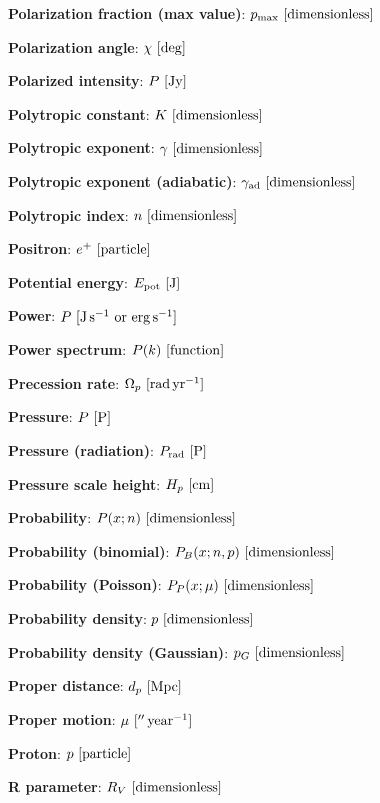 \documentclass[a4paper,10pt]{article}
\begin{document}
{\noindent}\textbf{Polarization fraction (max value)}: $p_\mathrm{max} ~ [{\rm dimensionless}]$

{\noindent}\textbf{Polarization angle}: $\chi ~ [{\rm deg}]$

{\noindent}\textbf{Polarized intensity}: $P ~ [{\rm Jy}]$

{\noindent}\textbf{Polytropic constant}: $K ~ [{\rm dimensionless}]$

{\noindent}\textbf{Polytropic exponent}: $\gamma ~ [{\rm dimensionless}]$

{\noindent}\textbf{Polytropic exponent (adiabatic)}: $\gamma_{\rm ad} ~ [{\rm dimensionless}]$

{\noindent}\textbf{Polytropic index}: $n ~ [{\rm dimensionless}]$

{\noindent}\textbf{Positron}: $e^+ ~ [{\rm particle}]$

{\noindent}\textbf{Potential energy}: $E_\mathrm{pot} ~ [{\rm J}]$

{\noindent}\textbf{Power}: $P ~ [{\rm J\,s^{-1}~{\rm or}~{\rm erg\,s^{-1}}}]$

{\noindent}\textbf{Power spectrum}: $P(k) ~ [{\rm function}]$

{\noindent}\textbf{Precession rate}: $\Omega_p ~ [{\rm rad\,yr^{-1}}]$

{\noindent}\textbf{Pressure}: $P ~ [{\rm P}]$

{\noindent}\textbf{Pressure (radiation)}: $P_{\rm rad} ~ [{\rm P}]$

{\noindent}\textbf{Pressure scale height}: $H_p ~ [{\rm cm}]$

{\noindent}\textbf{Probability}: $P(x;n) ~ [{\rm dimensionless}]$

{\noindent}\textbf{Probability (binomial)}: $P_B(x;n,p) ~ [{\rm dimensionless}]$

{\noindent}\textbf{Probability (Poisson)}: $P_P(x;\mu) ~ [{\rm dimensionless}]$

{\noindent}\textbf{Probability density}: $p ~ [{\rm dimensionless}]$

{\noindent}\textbf{Probability density (Gaussian)}: $p_G ~ [{\rm dimensionless}]$

{\noindent}\textbf{Proper distance}: $d_p ~ [{\rm Mpc}]$

{\noindent}\textbf{Proper motion}: $\mu ~ [{\rm ''\,year^{-1}}]$

{\noindent}\textbf{Proton}: $p ~ [{\rm particle}]$

{\noindent}\textbf{R parameter}: $R_V ~ [{\rm dimensionless}]$
\end{document}
